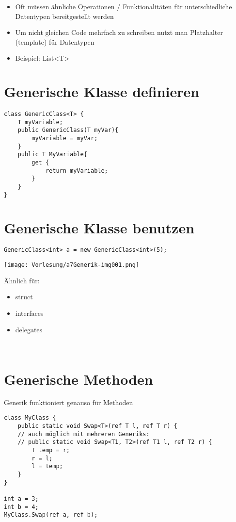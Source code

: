 \begin{itemize}
\item Oft müssen ähnliche Operationen / Funktionalitäten für unterschiedliche Datentypen bereitgestellt werden
\item Um nicht gleichen Code mehrfach zu schreiben nutzt man Platzhalter (template) für Datentypen
\item Beispiel: List<T>
\end{itemize}

\section{Generische Klasse definieren}

\begin{lstlisting}[language={[Sharp]C}]
class GenericClass<T> {
	T myVariable;
	public GenericClass(T myVar){
		myVariable = myVar;	
	}
	public T MyVariable{
		get {
			return myVariable;		
		}
	}
}
\end{lstlisting}

\section{Generische Klasse benutzen}

\begin{lstlisting}[language={[Sharp]C}]
GenericClass<int> a = new GenericClass<int>(5);
\end{lstlisting}

\begin{center}
\texttt{[image: Vorlesung/a7Generik-img001.png]}
\end{center}

Ähnlich für: 
\begin{itemize}
\item struct 
\item interfaces
\item delegates
\end{itemize}
~

\section{Generische Methoden}
Generik funktioniert genauso für Methoden
\begin{lstlisting}[language={[Sharp]C}]
class MyClass {
	public static void Swap<T>(ref T l, ref T r) { 
	// auch möglich mit mehreren Generiks:
	// public static void Swap<T1, T2>(ref T1 l, ref T2 r) { 
		T temp = r;
		r = l;
		l = temp;   
	}
}

int a = 3;
int b = 4;
MyClass.Swap(ref a, ref b);
\end{lstlisting}

